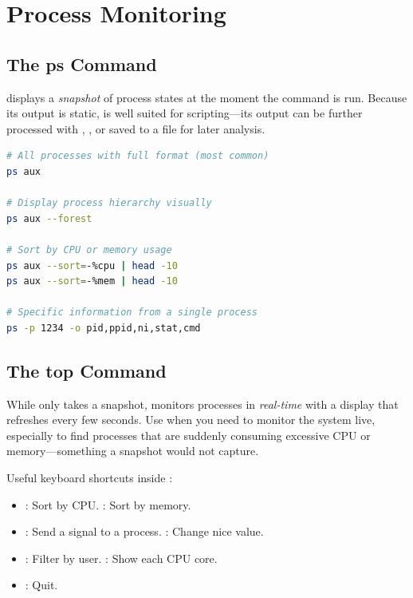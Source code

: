 \section{Process Monitoring}
\label{sec:process-monitoring}

\subsection{The ps Command}

 displays a \textit{snapshot} of process states at the moment the
command is run. Because its output is static,  is well suited for
scripting---its output can be further processed with , ,
or saved to a file for later analysis.

\begin{lstlisting}[language=bash, caption={Variations of ps usage}]
# All processes with full format (most common)
ps aux

# Display process hierarchy visually
ps aux --forest

# Sort by CPU or memory usage
ps aux --sort=-%cpu | head -10
ps aux --sort=-%mem | head -10

# Specific information from a single process
ps -p 1234 -o pid,ppid,ni,stat,cmd
\end{lstlisting}

\subsection{The top Command}

While  only takes a snapshot,  monitors processes in
\textit{real-time} with a display that refreshes every few seconds. Use
 when you need to monitor the system live, especially to find
processes that are suddenly consuming excessive CPU or memory---something a
 snapshot would not capture.

Useful keyboard shortcuts inside :

\begin{itemize}
  \item {}: Sort by CPU. \quad {}: Sort by memory.
  \item {}: Send a signal to a process. \quad {}: Change nice value.
  \item {}: Filter by user. \quad {}: Show each CPU core.
  \item {}: Quit.
\end{itemize}

